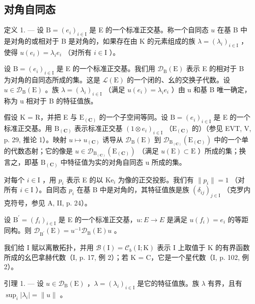 \subsection{对角自同态}

定义 1. --- 设 \(\mathrm{B} = (e_i)_{i \in \mathrm{I}}\) 是 E 的一个标准正交基。称一个自同态 \(u\) 在基 B 中是对角的或相对于 B 是对角的，如果存在由 K 的元素组成的族 \(\lambda = (\lambda_i)_{i \in \mathrm{I}}\) ，使得 \(u(e_i) = \lambda_i e_i\) （对所有 \(i \in \mathrm{I}\) ）。

设 \(\mathrm{B} = (e_i)_{i \in \mathrm{I}}\) 是 E 的一个标准正交基。我们用 \(\mathcal{D}_{\mathrm{B}}(\mathrm{E})\) 表示 E 的相对于 B 为对角的自同态所成的集。这是 \(\mathcal{L}(\mathrm{E})\) 的一个闭的、幺的交换子代数。设 \(u \in \mathcal{D}_{\mathrm{B}}(\mathrm{E})\) 。族 \(\lambda = (\lambda_i)_{i \in \mathrm{I}}\) （满足 \(u(e_i) = \lambda_i e_i\) ）由 u 和基 B 唯一确定，称为 u 相对于 B 的特征值族。

假设 K = R，并把 E 与 \(\mathrm{E}_{(\mathbf{C})}\) 的一个子空间等同。设 \(\mathrm{B} = (e_i)_{i \in \mathrm{I}}\) 是 E 的一个标准正交基。用 \(\mathrm{B}_{(\mathbf{C})}\) 表示标准正交基 \((1 \otimes e_i)_{i \in \mathrm{I}}\) （\(\mathrm{E}_{(\mathbf{C})}\) 的）（参见 EVT, V, p. 29, 推论 1）。映射 \(u \mapsto u_{(\mathbf{C})}\) 诱导从 \(\mathcal{D}_{\mathrm{B}}(\mathrm{E})\) 到 \(\mathcal{D}_{\mathrm{B}_{(\mathbf{C})}}(\mathrm{E}_{(\mathbf{C})})\) 中的一个单的代数态射；它的像是 \(u \in \mathcal{D}_{\mathrm{B}_{(\mathbf{C})}}(\mathrm{E}_{(\mathbf{C})})\) （满足 \(u(\mathrm{E}) \subset \mathrm{E}\) ）所成的集；换言之，即基 \(\mathrm{B}_{(\mathbf{C})}\) 中特征值为实的对角自同态 u 所成的集。

对每个 \(i \in \mathrm{I}\) ，用 \(p_i\) 表示 E 的以 \(\mathrm{Ke}_i\) 为像的正交投影。我们有 \(\| p_i \| = 1\) （对所有 \(i \in \mathrm{I}\) ）。自同态 \(p_i\) 在基 B 中是对角的，其特征值族是族 \((\delta_{ij})_{j\in\mathrm{I}}\) （克罗内克符号，参见 A, II, p. 24）。

设 \(\mathrm{B}^{\prime}=(f_{i})_{i\in\mathrm{I}}\) 是 E 的一个标准正交基，\(u:E\to E\) 是满足 \(u(f_{i})=e_{i}\) 的等距同构。则 \(\mathcal{D}_{\mathrm{B}^{\prime}}(\mathrm{E})=u^{-1}\mathcal{D}_{\mathrm{B}}(\mathrm{E})u\) 。

我们给 I 赋以离散拓扑，并用 \(\mathcal{B}(\mathrm{I}) = \mathcal{C}_{b}(\mathrm{I}; \mathrm{K})\) 表示 I 上取值于 K 的有界函数所成的幺巴拿赫代数（I, p. 17, 例 2）；若 K = C，它是一个星代数（I, p. 102, 例 2）。

引理 1. --- 设 \(u \in \mathcal{D}_{\mathrm{B}}(\mathrm{E})\) ，\(\lambda = (\lambda_i)_{i \in \mathrm{I}}\) 是它的特征值族。族 \(\lambda\) 有界，且有 \(\sup_i |\lambda_i| = \| u\|\) 。

